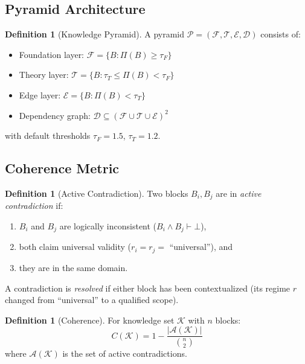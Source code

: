 \documentclass[11pt,a4paper]{article}
\theoremstyle{definition}
\newtheorem{definition}[theorem]{Definition}
\newcommand{\tp}{\Pi}
\begin{document}
\subsection{Pyramid Architecture}

\begin{definition}[Knowledge Pyramid]\label{def:pyramid}
A pyramid $\mathcal{P} = (\mathcal{F}, \mathcal{T}, \mathcal{E}, \mathcal{D})$ consists of:
\begin{itemize}[nosep,leftmargin=*]
\item Foundation layer: $\mathcal{F} = \{B : \tp(B) \geq \tau_F\}$
\item Theory layer: $\mathcal{T} = \{B : \tau_T \leq \tp(B) < \tau_F\}$
\item Edge layer: $\mathcal{E} = \{B : \tp(B) < \tau_T\}$
\item Dependency graph: $\mathcal{D} \subseteq (\mathcal{F} \cup \mathcal{T} \cup \mathcal{E})^2$
\end{itemize}
with default thresholds $\tau_F = 1.5$, $\tau_T = 1.2$.
\end{definition}

\subsection{Coherence Metric}

\begin{definition}[Active Contradiction]\label{def:contradiction}
Two blocks $B_i, B_j$ are in \emph{active contradiction} if:
\begin{enumerate}[nosep]
\item $B_i$ and $B_j$ are logically inconsistent ($B_i \wedge B_j \vdash \bot$),
\item both claim universal validity ($r_i = r_j = $ ``universal''), and
\item they are in the same domain.
\end{enumerate}
A contradiction is \emph{resolved} if either block has been contextualized (its regime $r$ changed from ``universal'' to a qualified scope).
\end{definition}

\begin{definition}[Coherence]\label{def:coherence}
For knowledge set $\mathcal{K}$ with $n$ blocks:
\begin{equation}\label{eq:coherence}
C(\mathcal{K}) = 1 - \frac{|\mathcal{A}(\mathcal{K})|}{\binom{n}{2}}
\end{equation}
where $\mathcal{A}(\mathcal{K})$ is the set of active contradictions.
\end{definition}
\end{document}
